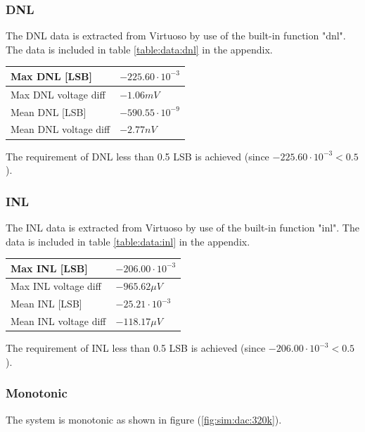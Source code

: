 \documentclass[english, 12pt, a4paper]{ifimaster}
\begin{document}
\subsubsection{DNL}

The DNL data is extracted from Virtuoso by use of the built-in function "dnl". 
The data is included in table \ref{table:data:dnl} in the appendix.

\begin{tabular}[t]{|l|l|}
 \hline 
  
Max DNL [LSB] & \(-225.60 \cdot 10^{-3} \) \\ \hline
Max DNL voltage diff & \(-1.06 mV \) \\ \hline

Mean DNL [LSB] & \(-590.55 \cdot 10^{-9}\) \\ \hline
Mean DNL voltage diff & \(-2.77 nV \) \\ \hline
\end{tabular}

\hfill \break
\noindent 
The requirement of DNL less than 0.5 LSB is achieved (since \(-225.60 \cdot 10^{-3}  < 0.5 \)).
 

\subsubsection{INL}
The INL data is extracted from Virtuoso by use of the built-in function "inl". 
The data is included in table \ref{table:data:inl} in the appendix.

\begin{tabular}[t]{|l|l|}
 \hline 
  
Max INL [LSB] & \(-206.00 \cdot 10^{-3} \) \\ \hline
Max INL voltage diff & \(-965.62 \mu V \) \\ \hline

Mean INL [LSB] & \(-25.21 \cdot 10^{-3} \) \\ \hline
Mean INL voltage diff & \( -118.17 \mu V \) \\ \hline
\end{tabular}

\hfill \break
\noindent 
The requirement of INL less than 0.5 LSB is achieved (since \(-206.00 \cdot 10^{-3}  < 0.5 \)).

\subsubsection{Monotonic}
The system is monotonic as shown in figure (\ref{fig:sim:dac:320k}).
\end{document}
